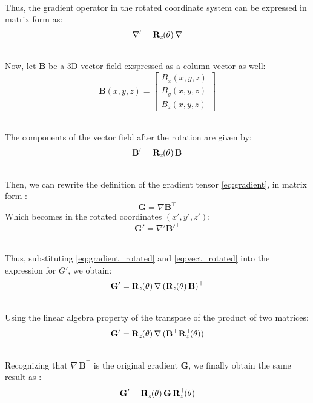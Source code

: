 \documentclass[main]{subfiles}
\begin{document}
\noindent\\
Thus, the gradient operator in the rotated coordinate system 
can be expressed in matrix form as:
\begin{equation}
\nabla' 
= 
\mathbf{R}_z\mkern-2mu(\theta) \, \nabla
\label{eq:gradient_rotated}
\end{equation}

\noindent\\
Now, let \( \mathbf{B} \) be a 3D vector field exspressed as a column vector as well:
\[
\mathbf{B}(x, y, z) = 
\begin{bmatrix}
 B_x(x, y, z) \\
 B_y(x, y, z) \\
 B_z(x, y, z)
\end{bmatrix}
\]

\noindent\\
The components of the vector field after the rotation 
are given by:
\begin{equation}
 \mathbf{B}' = \mathbf{R}_z\mkern-2mu(\theta) \, \mathbf{B}
\label{eq:vect_rotated}
\end{equation}

\noindent\\
Then, we can rewrite the definition of the gradient tensor \eqref{eq:gradient},
in matrix form \cite{gradient_tensor_rotated}:
\[
\mathbf{G} = \nabla \mathbf{B}^\top
\]
Which becomes in the rotated coordinates $(x', y', z')$:
\[
\mathbf{G}' = \nabla' \mathbf{B}'^\top
\]

\noindent\\
Thus, substituting \ref{eq:gradient_rotated} and \ref{eq:vect_rotated}
into the expression for \( G' \), we obtain:
\[
\mathbf{G}' = \mathbf{R}_z\mkern-2mu(\theta) \,  \nabla \, (\mathbf{R}_z\mkern-2mu(\theta) \, \mathbf{B})^\top
\]

\noindent\\
Using the linear algebra property of the transpose of the product of two matrices:
\[
\mathbf{G}' = \mathbf{R}_z\mkern-2mu(\theta) \, \nabla \, (\mathbf{B}^\top {\mathbf{R}}^\top_z\mkern-3.5mu(\theta))
\]

\noindent\\
Recognizing that \( \nabla \, \mathbf{B}^\top \) is the original gradient 
\( \mathbf{G} \), we finally obtain the same result as \cite{gradient_tensor_rotated}:
\begin{equation}
 \mathbf{G}' = \mathbf{R}_z\mkern-2mu(\theta) \, \mathbf{G} \, {\mathbf{R}}^\top_z\mkern-3.5mu(\theta)
    \label{eq:rotated_gradient_tensor}
\end{equation}
\end{document}
